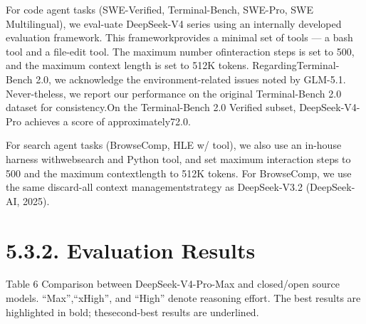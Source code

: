 \documentclass[
  10
]{article}
\begin{document}
For code agent tasks (SWE-Verified, Terminal-Bench, SWE-Pro, SWE
Multilingual), we eval-uate DeepSeek-V4 series using an internally
developed evaluation framework. This frameworkprovides a minimal set of
tools --- a bash tool and a file-edit tool. The maximum number
ofinteraction steps is set to 500, and the maximum context length is set
to 512K tokens. RegardingTerminal-Bench 2.0, we acknowledge the
environment-related issues noted by GLM-5.1. Never-theless, we report
our performance on the original Terminal-Bench 2.0 dataset for
consistency.On the Terminal-Bench 2.0 Verified subset, DeepSeek-V4-Pro
achieves a score of approximately72.0.

For search agent tasks (BrowseComp, HLE w/ tool), we also use an
in-house harness withwebsearch and Python tool, and set maximum
interaction steps to 500 and the maximum contextlength to 512K tokens.
For BrowseComp, we use the same discard-all context managementstrategy
as DeepSeek-V3.2 (DeepSeek-AI, 2025).

\section{5.3.2. Evaluation Results}\label{evaluation-results-1}

Table 6 \textbar{} Comparison between DeepSeek-V4-Pro-Max and
closed/open source models. ``Max'',``xHigh'', and ``High'' denote
reasoning effort. The best results are highlighted in bold;
thesecond-best results are underlined.
\end{document}
